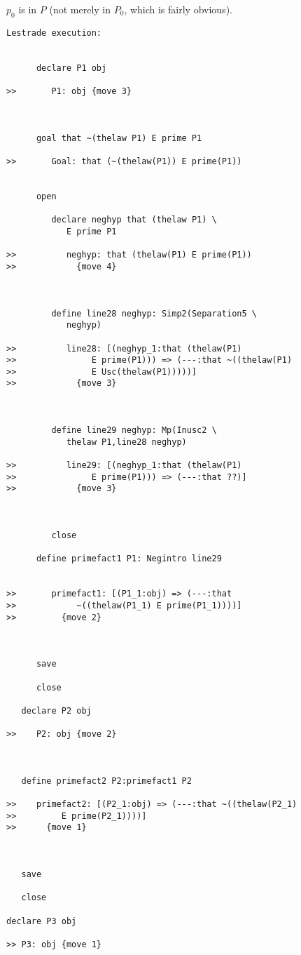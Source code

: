 \documentclass[12pt]{article}
\begin{document}
$p_0$ is in $P$ (not merely in $P_0$, which is fairly obvious).

\begin{verbatim}Lestrade execution:


      declare P1 obj

>>       P1: obj {move 3}



      goal that ~(thelaw P1) E prime P1

>>       Goal: that (~(thelaw(P1)) E prime(P1))


      open

         declare neghyp that (thelaw P1) \
            E prime P1

>>          neghyp: that (thelaw(P1) E prime(P1))
>>            {move 4}



         define line28 neghyp: Simp2(Separation5 \
            neghyp)

>>          line28: [(neghyp_1:that (thelaw(P1)
>>               E prime(P1))) => (---:that ~((thelaw(P1)
>>               E Usc(thelaw(P1)))))]
>>            {move 3}



         define line29 neghyp: Mp(Inusc2 \
            thelaw P1,line28 neghyp)

>>          line29: [(neghyp_1:that (thelaw(P1)
>>               E prime(P1))) => (---:that ??)]
>>            {move 3}



         close

      define primefact1 P1: Negintro line29


>>       primefact1: [(P1_1:obj) => (---:that
>>            ~((thelaw(P1_1) E prime(P1_1))))]
>>         {move 2}



      save

      close

   declare P2 obj

>>    P2: obj {move 2}



   define primefact2 P2:primefact1 P2

>>    primefact2: [(P2_1:obj) => (---:that ~((thelaw(P2_1)
>>         E prime(P2_1))))]
>>      {move 1}



   save

   close

declare P3 obj

>> P3: obj {move 1}




\end{verbatim}
\end{document}
